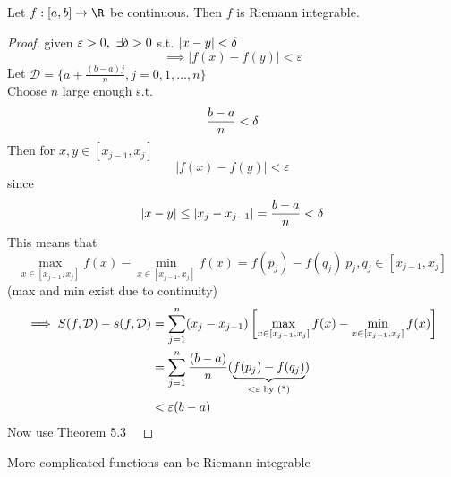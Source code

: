 \begin{theorem}
Let $f:[a,b]\to \R$ be continuous. Then $f$ is Riemann integrable.
\begin{proof}
given $\varepsilon > 0, \ \exists \de > 0$ s.t. $|x-y|<\de$
\[\implies |f(x) - f(y)|<\varepsilon\]
Let $\mathcal{D} = \{a + \frac{(b-a)j}{n}, j = 0,1,\dots, n\}$\\
Choose $n$ large enough s.t.
\[\frac{b-a}{n}<\de\]
Then for $x,y\in [x_{j-1},x_j]$
\[|f(x) - f(y)|<\varepsilon\tag{*}\]
since 
\[|x-y| \leq |x_j - x_{j-1}| = \frac{b-a}{n} < \de\]
This means that
\[\max_{x\in [x_{j-1},x_j]} f(x)- \min_{x\in [x_{j-1},x_j]}f(x) = f(p_j) - f(q_j) \ p_j,q_j\in [x_{j-1},x_j]\]
(max and min exist due to continuity)
\begin{align*}
    \implies S(f, \mathcal{D}) - s(f,\mathcal{D}) &= \s[j]{n}(x_j - x_{j-1})\left[\max_{x\in [x_{j-1},x_j]} f(x)- \min_{x\in [x_{j-1},x_j]}f(x)\right]\\
    &=\s[j] n \frac{(b-a)}{n}(\underbrace{f(p_j) - f(q_j)}_{<\varepsilon\text{ by (*)}})\\
    &<\varepsilon(b-a)
\end{align*}
Now use Theorem 5.3 \
\end{proof}
\end{theorem}
\begin{remark}
More complicated functions can be Riemann integrable
\end{remark}
